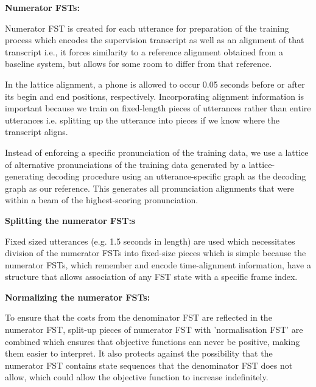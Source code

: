 \textbf{Numerator FSTs:}

Numerator FST is created for each utterance for preparation of the training process which encodes the supervision transcript as well as an alignment of that transcript i.e., it forces similarity to a reference alignment obtained from a baseline system, but allows for some room to differ from that reference. 

In the lattice alignment, a phone is allowed to occur 0.05 seconds before or after its begin and end positions, respectively. Incorporating alignment information is important because we train on fixed-length pieces of utterances rather than entire utterances i.e. splitting up the utterance into pieces if we know where the transcript aligns. %

Instead of enforcing a specific pronunciation of the training data, we use a lattice of alternative pronunciations of the training data generated by a lattice-generating decoding procedure using an utterance-specific graph as the decoding graph as our reference. This generates all pronunciation alignments that were within a beam of the highest-scoring pronunciation.

\textbf{Splitting the numerator FST:s}

Fixed sized utterances (e.g. 1.5 seconds in length) are used which necessitates division of the numerator FSTs into fixed-size pieces which is simple because the numerator FSTs, which remember and encode time-alignment information, have a structure that allows association of any FST state with a specific frame index. %

\textbf{Normalizing the numerator FSTs:}

To ensure that the costs from the denominator FST are reflected in the numerator FST, split-up pieces of numerator FST with 'normalisation FST' are combined which ensures that objective functions can never be positive, making them easier to interpret. It also protects against the possibility that the numerator FST contains state sequences that the denominator FST does not allow, which could allow the objective function to increase indefinitely.


